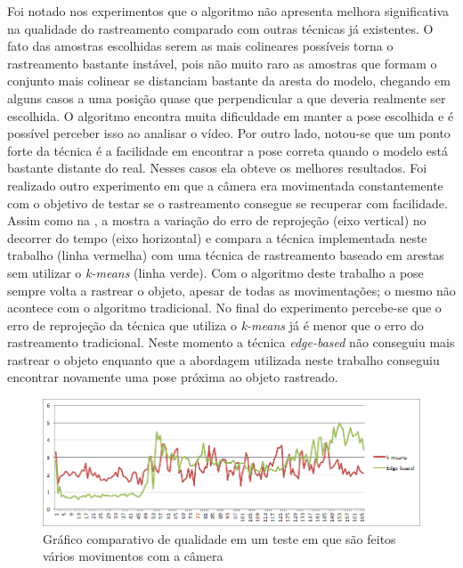 Foi notado nos experimentos que o algoritmo não apresenta melhora significativa na qualidade do rastreamento comparado com outras técnicas já existentes. O fato das amostras escolhidas serem as mais colineares possíveis torna o rastreamento bastante instável, pois não muito raro as amostras que formam o conjunto mais colinear se distanciam bastante da aresta do modelo, chegando em alguns casos a uma posição quase que perpendicular a que deveria realmente ser escolhida. O algoritmo encontra muita dificuldade em manter a pose escolhida e é possível perceber isso ao analisar o vídeo. Por outro lado, notou-se que um ponto forte da técnica é a facilidade em encontrar a pose correta quando o modelo está bastante distante do real. Nesses casos ela obteve os melhores resultados. Foi realizado outro experimento em que a câmera era movimentada constantemente com o objetivo de testar se o rastreamento consegue se recuperar com facilidade. Assim como na , a  mostra a variação do erro de reprojeção (eixo vertical) no decorrer do tempo (eixo horizontal) e compara a técnica implementada neste trabalho (linha vermelha) com uma técnica de rastreamento baseado em arestas sem utilizar o \emph{k-means} (linha verde). Com o algoritmo deste trabalho a pose sempre volta a rastrear o objeto, apesar de todas as movimentações; o mesmo não acontece com o algoritmo tradicional. No final do experimento percebe-se que o erro de reprojeção da técnica que utiliza o \emph{k-means} já é menor que o erro do rastreamento tradicional. Neste momento a técnica \emph{edge-based} não conseguiu mais rastrear o objeto enquanto que a abordagem utilizada neste trabalho conseguiu encontrar novamente uma pose próxima ao objeto rastreado.

\begin{figure}[!ht]
\centering\includegraphics[width=\textwidth]{monografia/qualidade_celine_boa}
\caption{Gráfico comparativo de qualidade em um teste em que são feitos vários movimentos com a câmera}
\label{qualidade_celine_boa}
\end{figure}

